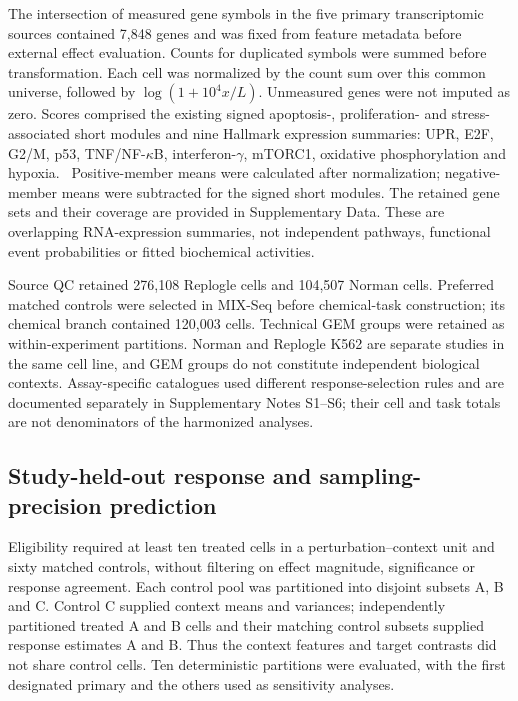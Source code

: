 \documentclass[a4paper,fleqn]{cas-sc}
\makeatletter
\DeclareRobustCommand{\rev}[1]{{\color{red}\def\@citecolor{black}\def\@linkcolor{red}\def\@urlcolor{red}#1}}
\let\unmarkedcite\cite
\renewcommand{\cite}[1]{{\color{black}\def\@citecolor{black}\unmarkedcite{#1}}}
\makeatother
\begin{document}
\rev{The intersection of measured gene symbols in the five primary transcriptomic sources contained 7,848 genes and was fixed from feature metadata before external effect evaluation.} \rev{Counts for duplicated symbols were summed before transformation.} \rev{Each cell was normalized by the count sum over this common universe, followed by $\log(1+10^4x/L)$.} \rev{Unmeasured genes were not imputed as zero.} \rev{Scores comprised the existing signed apoptosis-, proliferation- and stress-associated short modules and nine Hallmark expression summaries: UPR, E2F, G2/M, p53, TNF/NF-$\kappa$B, interferon-$\gamma$, mTORC1, oxidative phosphorylation and hypoxia.~\cite{liberzon2015}} \rev{Positive-member means were calculated after normalization; negative-member means were subtracted for the signed short modules.} \rev{The retained gene sets and their coverage are provided in Supplementary Data.} \rev{These are overlapping RNA-expression summaries, not independent pathways, functional event probabilities or fitted biochemical activities.}

\rev{Source QC retained 276,108 Replogle cells and 104,507 Norman cells.} \rev{Preferred matched controls were selected in MIX-Seq before chemical-task construction; its chemical branch contained 120,003 cells.} \rev{Technical GEM groups were retained as within-experiment partitions.} \rev{Norman and Replogle K562 are separate studies in the same cell line, and GEM groups do not constitute independent biological contexts.} \rev{Assay-specific catalogues used different response-selection rules and are documented separately in Supplementary Notes S1--S6; their cell and task totals are not denominators of the harmonized analyses.}

\subsection{\rev{Study-held-out response and sampling-precision prediction}}

\rev{Eligibility required at least ten treated cells in a perturbation--context unit and sixty matched controls, without filtering on effect magnitude, significance or response agreement.} \rev{Each control pool was partitioned into disjoint subsets A, B and C.} \rev{Control C supplied context means and variances; independently partitioned treated A and B cells and their matching control subsets supplied response estimates A and B.} \rev{Thus the context features and target contrasts did not share control cells.} \rev{Ten deterministic partitions were evaluated, with the first designated primary and the others used as sensitivity analyses.}
\end{document}
